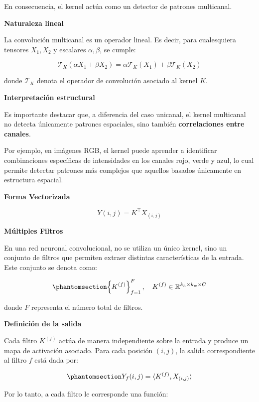 \documentclass[
  spanish,
  us-letterpaper,
]{scrreprt}
\theoremstyle{definition}
\theoremstyle{remark}
\begin{document}
En consecuencia, el kernel actúa como un detector de patrones
multicanal.

\textbf{Naturaleza lineal}

La convolución multicanal es un operador lineal. Es decir, para
cualesquiera tensores \(X_1, X_2\) y escalares \(\alpha, \beta\), se
cumple:

\[
\mathcal{T}_K(\alpha X_1 + \beta X_2)
=
\alpha \mathcal{T}_K(X_1) + \beta \mathcal{T}_K(X_2)
\]

donde \(\mathcal{T}_K\) denota el operador de convolución asociado al
kernel \(K\).

\textbf{Interpretación estructural}

Es importante destacar que, a diferencia del caso unicanal, el kernel
multicanal no detecta únicamente patrones espaciales, sino también
\textbf{correlaciones entre canales}.

Por ejemplo, en imágenes RGB, el kernel puede aprender a identificar
combinaciones específicas de intensidades en los canales rojo, verde y
azul, lo cual permite detectar patrones más complejos que aquellos
basados únicamente en estructura espacial.

\textbf{Forma Vectorizada}

\[
Y(i,j) = K^\top X_{(i,j)}
\]

\textbf{Múltiples Filtros}

En una red neuronal convolucional, no se utiliza un único kernel, sino
un conjunto de filtros que permiten extraer distintas características de
la entrada. Este conjunto se denota como:

\begin{equation}\phantomsection\label{eq-conjunto-filtros}{
\left\{ K^{(f)} \right\}_{f=1}^{F}, \quad
K^{(f)} \in \mathbb{R}^{k_h \times k_w \times C}
}\end{equation}

donde \(F\) representa el número total de filtros.

\textbf{Definición de la salida}

Cada filtro \(K^{(f)}\) actúa de manera independiente sobre la entrada y
produce un mapa de activación asociado. Para cada posición \((i,j)\), la
salida correspondiente al filtro \(f\) está dada por:

\begin{equation}\phantomsection\label{eq-salida-filtro}{
Y_f(i,j) = \langle K^{(f)}, X_{(i,j)} \rangle
}\end{equation}

Por lo tanto, a cada filtro le corresponde una función:
\end{document}
